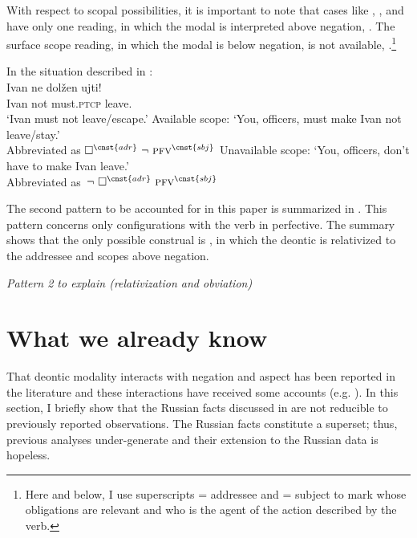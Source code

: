 \documentclass[output=paper,
modfonts,
newtxmath,colorlinks,citecolor=brown
]{langscibook}
\begin{document}
\noindent With respect to scopal possibilities, it is important to note that cases like , , and  have only one reading, in which the modal is interpreted above negation, . The surface scope reading, in which the modal is below negation, is not available, .\footnote{Here and below, I use superscripts  = addressee and  = subject to mark whose obligations are relevant and who is the agent of the action described by the verb.
}

\ea \label{relatscope} \ea In the situation described in :\\
	{\gll  Ivan ne dolžen ujti!\\	
	Ivan  not must.\textsc{ptcp} {leave.\p} \\
	\glt `Ivan must not leave/escape.'}
	\ex Available scope: `You, officers, must make Ivan  not leave/stay.'\\
    Abbreviated as  $\Box^{\cnst{adr}}\ \neg\ \textsc{pfv}^{\cnst{sbj}}$ \label{relatsca}
    \ex Unavailable scope: `You, officers, don't have to make Ivan leave.'\\
    Abbreviated as  $\,\neg\ \Box^{\cnst{adr}}\  \textsc{pfv}^{\cnst{sbj}}$ \label{relatscu}
	\z \z 
        
\noindent The second pattern to be accounted for in this paper is summarized in . This pattern concerns only configurations with the verb in perfective. The summary shows that the only possible construal is , in which the deontic is relativized to the addressee and scopes above negation.


\ea \textit{Pattern 2 to explain (relativization and obviation)}\label{p22} 
\z \z


\section{What we already know}\label{sect:preliminaries}
That deontic modality interacts with negation and aspect has been reported in the literature and these interactions have received some accounts (e.g. \citealt{han99,nin05,iatzei13}). In this section, I briefly show that the Russian facts discussed in  are not reducible to previously reported observations. The Russian facts constitute a superset; thus, previous  analyses under-generate and their extension to the Russian data is hopeless. 
\end{document}
